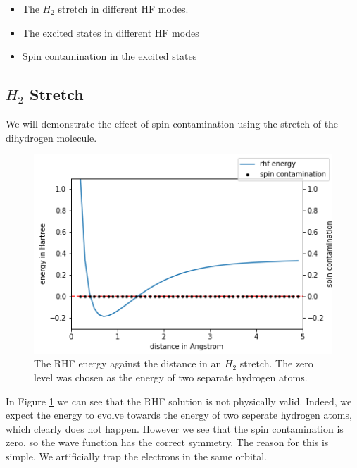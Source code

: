 \documentclass[twoside,twocolumn,9pt]{article}
\begin{document}
\begin{itemize}
    \item The $H_2$ stretch in different HF modes.
    \item The excited states in different HF modes
    \item Spin contamination in the excited states
\end{itemize}

\subsection{$H_2$ Stretch}
We will demonstrate the effect of spin contamination using the stretch of the dihydrogen molecule.
\begin{center}
  \begin{figure}[h]
      \includegraphics[width=\linewidth]{./../notes/figures/rhf.png}
      \caption{The RHF energy against the distance in an $H_2$ stretch. The zero level was chosen as the energy of two separate hydrogen atoms.}
      \label{fig:rhfstretch}
  \end{figure}
\end{center}
In Figure \ref{fig:rhfstretch} we can see that the RHF solution is not physically valid. Indeed, we expect the energy to evolve towards the energy of two seperate hydrogen atoms, which clearly does not happen. However we see that the spin contamination is zero, so the wave function has the correct symmetry. The reason for this is simple. We artificially trap the electrons in the same orbital.
\end{document}
